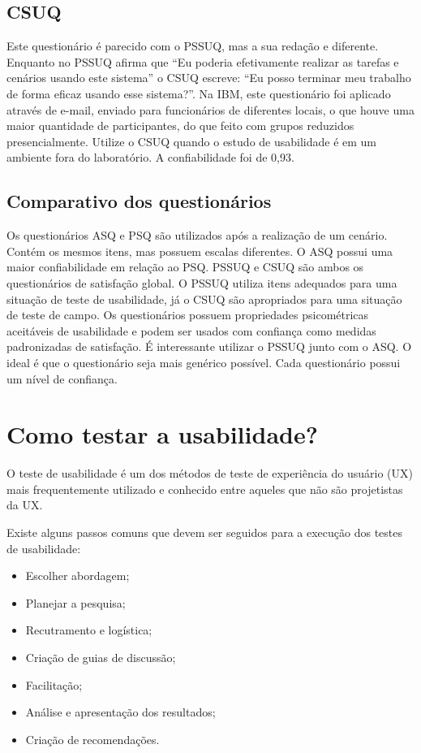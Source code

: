\subsection{CSUQ}

Este questionário é parecido com o PSSUQ, mas a sua redação e diferente. Enquanto no PSSUQ afirma que “Eu poderia efetivamente realizar as tarefas e cenários usando este sistema” o CSUQ escreve: “Eu posso terminar meu trabalho de forma eficaz usando esse sistema?”. 
Na IBM, este questionário foi aplicado através de e-mail, enviado para funcionários de diferentes locais, o que houve uma maior quantidade de participantes, do que feito com grupos reduzidos presencialmente.
Utilize o CSUQ quando o estudo de usabilidade é em um ambiente fora do laboratório.
A confiabilidade foi de 0,93.

\subsection{Comparativo dos questionários}

Os questionários ASQ e PSQ são utilizados após a realização de um cenário. Contém os mesmos itens, mas possuem escalas diferentes. O ASQ possui uma maior confiabilidade em relação ao PSQ. 
PSSUQ e CSUQ são ambos os questionários de satisfação global. O PSSUQ utiliza itens adequados para uma situação de teste de usabilidade, já o CSUQ são apropriados para uma situação de teste de campo. Os questionários possuem propriedades psicométricas aceitáveis de usabilidade e podem ser usados com confiança como medidas padronizadas de satisfação. É interessante utilizar o PSSUQ junto com o ASQ.
O ideal é que o questionário seja mais genérico possível. Cada questionário possui um nível de confiança.


\section{Como testar a usabilidade?}

O teste de usabilidade é um dos métodos de teste de experiência do usuário (UX) mais frequentemente utilizado e conhecido entre aqueles que não são projetistas da UX.

Existe alguns passos comuns que devem ser seguidos para a execução dos testes de usabilidade:

\begin{itemize}

\item Escolher abordagem;
\item Planejar a pesquisa;
\item Recutramento e logística;
\item Criação de guias de discussão;
\item Facilitação;
\item Análise e apresentação dos resultados;
\item Criação de recomendações.
\end{itemize}


